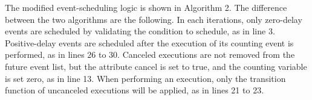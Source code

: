 \documentclass[]{interact}
\theoremstyle{plain}%
\theoremstyle{definition}
\theoremstyle{remark}
\begin{document}
The modified event-scheduling logic is shown in Algorithm 2. The difference between the two algorithms are the following. In each iterations, only zero-delay events are scheduled by validating the condition to schedule, as in line 3. Positive-delay events are scheduled after the execution of its counting event is performed, as in lines 26 to 30. Canceled executions are not removed from the future event list, but the attribute cancel is set to true, and the counting variable is set zero, as in line 13. When performing an execution, only the transition function of uncanceled executions will be applied, as in lines 21 to 23. 

\end{document}
